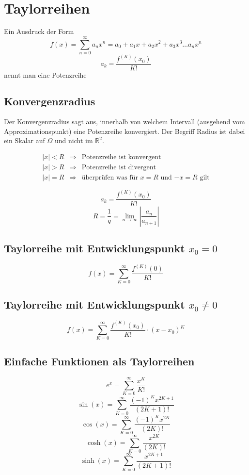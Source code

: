 \section{Taylorreihen}
Ein Ausdruck der Form 
\[ \boxed{f(x) = \sum_{n = 0}^{\infty} a_n x^n = a_0 + a_1 x + a_2 x^2 + a_3 x^3 \dots a_n x^n} \]
\[ \boxed{a_k = \frac{f^{(K)}(x_0)}{K!}} \]
nennt man eine Potenzreihe

\subsection{Konvergenzradius}
Der Konvergenzradius sagt aus, innerhalb von welchem Intervall (ausgehend vom Approximationspunkt)
eine Potenzreihe konvergiert. Der Begriff Radius ist dabei ein Skalar auf $\Omega$ und nicht im $\mathbb{R}^2$.

\begin{figure}[h!]
\centering
\end{figure}

\[ \boxed{ \begin{array}{lll} 
    |x| < R & \Rightarrow & \text{Potenzreihe ist konvergent} \\
    |x| > R & \Rightarrow & \text{Potenzreihe ist divergent} \\
    |x| = R & \Rightarrow & \text{überprüfen was für $x=R$ und $-x=R$ gilt}
\end{array} } \]

\[ \boxed{a_k = \frac{f^{(K)}(x_0)}{K!}} \]
\[ \boxed{R = \frac{1}{q} = \lim_{n \rightarrow \infty} \left| \frac{a_n}{a_{n + 1}} \right|} \]

\subsection{Taylorreihe mit Entwicklungspunkt $x_0 = 0$}
\[ \boxed{f(x) = \sum_{K=0}^{\infty}\frac{f^{(K)}(0)}{K!}} \]

\subsection{Taylorreihe mit Entwicklungspunkt $x_0 \neq 0$}
\[ \boxed{f(x) = \sum_{K=0}^{\infty}\frac{f^{(K)}(x_0)}{K!}\cdot (x-x_0)^K} \]

\subsection{Einfache Funktionen als Taylorreihen}
\[ \boxed{e^x = \sum_{K=0}^{\infty} \frac{x^K}{K!}} \]
\[ \boxed{\sin(x) = \sum_{K=0}^{\infty} \frac{(-1)^K x^{2K+1}}{(2K+1)!}} \]
\[ \boxed{\cos(x) = \sum_{K=0}^{\infty} \frac{(-1)^K x^{2K}}{(2K)!}} \]
\[ \boxed{\cosh(x) = \sum_{K=0}^{\infty} \frac{x^{2K}}{(2K)!}} \]
\[ \boxed{\sinh(x) = \sum_{K=0}^{\infty} \frac{x^{2K+1}}{(2K+1)!}} \]

